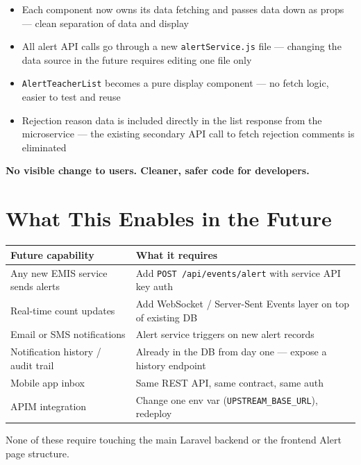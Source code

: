 \documentclass[11pt]{article}
\begin{document}
\begin{itemize}
  \item Each component now owns its data fetching and passes data down as props ---
        clean separation of data and display
  \item All alert API calls go through a new \texttt{alertService.js} file --- changing
        the data source in the future requires editing one file only
  \item \texttt{AlertTeacherList} becomes a pure display component --- no fetch logic,
        easier to test and reuse
  \item Rejection reason data is included directly in the list response from the microservice
        --- the existing secondary API call to fetch rejection comments is eliminated
\end{itemize}

\textbf{No visible change to users. Cleaner, safer code for developers.}

\section{What This Enables in the Future}

\begin{table}[h]
\small
\begin{tabularx}{\textwidth}{X X}
\toprule
\textbf{Future capability} & \textbf{What it requires} \\
\midrule
Any new EMIS service sends alerts & Add \texttt{POST /api/events/alert} with service API key auth \\
Real-time count updates & Add WebSocket / Server-Sent Events layer on top of existing DB \\
Email or SMS notifications & Alert service triggers on new alert records \\
Notification history / audit trail & Already in the DB from day one --- expose a history endpoint \\
Mobile app inbox & Same REST API, same contract, same auth \\
APIM integration & Change one env var (\texttt{UPSTREAM\_BASE\_URL}), redeploy \\
\bottomrule
\end{tabularx}
\end{table}

None of these require touching the main Laravel backend or the frontend Alert page structure.
\end{document}
